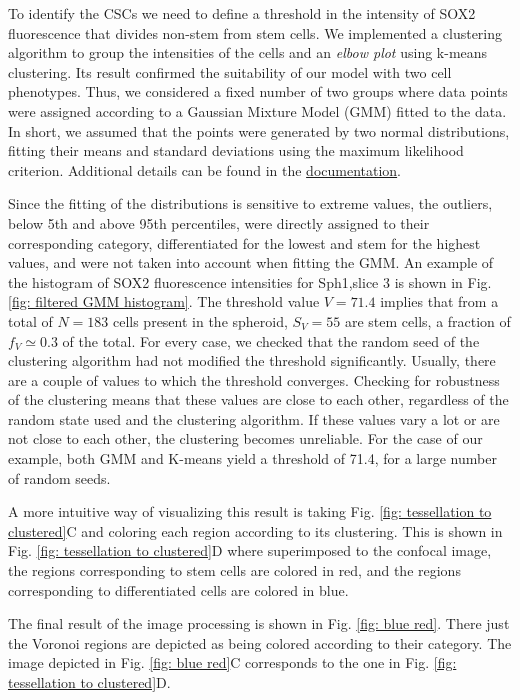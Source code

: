 \documentclass[fleqn,10pt]{wlscirep}
\begin{document}
To identify the CSCs we need to define a threshold in the intensity of SOX2 fluorescence that divides non-stem from stem cells. We implemented a clustering algorithm to group the intensities of the cells and an \emph{elbow plot} using k-means clustering. Its result confirmed the suitability of our model with two cell phenotypes. Thus, we considered a fixed number of two groups where data points were assigned according to a Gaussian Mixture Model (GMM) fitted to the data. In short, we assumed that the points were generated by two normal distributions, fitting their means and standard deviations using the maximum likelihood criterion. Additional details can be found in the  \href{https://scikit-learn.org/stable/modules/generated/sklearn.mixture.GaussianMixture.html}{documentation}.

Since the fitting of the distributions is sensitive to extreme values, the outliers, below 5th and above 95th percentiles, were directly assigned to their corresponding category, differentiated for the lowest and stem for the highest values, and were not taken into account when fitting the GMM. An example of the histogram of SOX2 fluorescence intensities for \textsf{Sph1,slice 3} is shown in Fig. \ref{fig: filtered GMM histogram}. The threshold value $V=71.4$ implies that from a total of $N=183$ cells present in the spheroid, $S_V=55$ are stem cells, a fraction of $f_V\simeq0.3$ of the total.
For every case, we checked that the random seed of the clustering algorithm had not modified the threshold significantly. Usually, there are a couple of values to which the threshold converges. Checking for robustness of the clustering means that these values are close to each other, regardless of the random state used and the clustering algorithm. If these values vary a lot or are not close to each other, the clustering becomes unreliable. For the case of our example, both GMM and K-means yield a threshold of 71.4, for a large number of random seeds.

A more intuitive way of visualizing this result is taking Fig. \ref{fig: tessellation to clustered}C and coloring each region according to its clustering. This is shown in Fig. \ref{fig: tessellation to clustered}D where superimposed to the confocal image, the regions corresponding to stem cells are colored in red, and the regions corresponding to differentiated cells are colored in blue. 

The final result of the image processing is shown in Fig. \ref{fig: blue red}. There just the Voronoi regions are depicted as being colored according to their category. The image depicted in Fig. \ref{fig: blue red}C corresponds to the one in Fig. \ref{fig: tessellation to clustered}D. 
\end{document}
